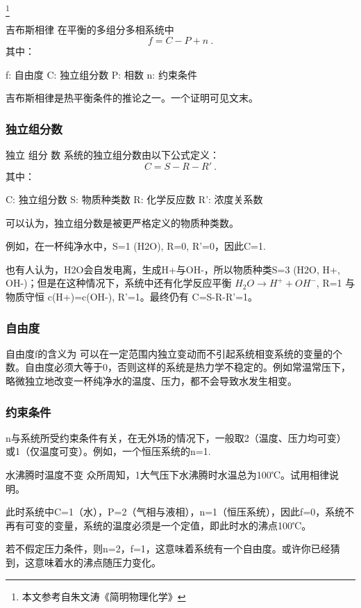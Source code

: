 
\footnote{本文参考自朱文涛《简明物理化学》}

\begin{theorem}{吉布斯相律}
在平衡的多组分多相系统中
\begin{equation}
f=C-P+n~.
\end{equation}
其中：

f: 自由度
C: 独立组分数
P: 相数
n: 约束条件
\end{theorem}
吉布斯相律是热平衡条件的推论之一。一个证明可见文末。

\subsubsection{独立组分数}
\begin{definition}{独立 组分 数}
系统的独立组分数由以下公式定义：
\begin{equation}
C=S-R-R'~.
\end{equation}
其中：

C: 独立组分数
S: 物质种类数
R: 化学反应数
R': 浓度关系数
\end{definition}

可以认为，独立组分数是被更严格定义的物质种类数。

例如，在一杯纯净水中，S=1 (H2O), R=0, R'=0，因此C=1.

也有人认为，H2O会自发电离，生成H+与OH-，所以物质种类S=3 (H2O, H+, OH-)；但是在这种情况下，系统中还有化学反应平衡 $H_2O\rightarrow H^++OH^-$, R=1 与物质守恒 c(H+)=c(OH-), R'=1。最终仍有 C=S-R-R'=1。

\subsubsection{自由度}
自由度f的含义为 可以在一定范围内独立变动而不引起系统相变系统的变量的个数。自由度必须大等于0，否则这样的系统是热力学不稳定的。例如常温常压下，略微独立地改变一杯纯净水的温度、压力，都不会导致水发生相变。

\subsubsection{约束条件}
n与系统所受约束条件有关，在无外场的情况下，一般取2（温度、压力均可变）或1（仅温度可变）。例如，一个恒压系统的n=1.

\begin{example}{水沸腾时温度不变}
众所周知，1大气压下水沸腾时水温总为100℃。试用相律说明。

此时系统中C=1（水），P=2（气相与液相），n=1（恒压系统），因此f=0，系统不再有可变的变量，系统的温度必须是一个定值，即此时水的沸点100℃。

若不假定压力条件，则n=2，f=1，这意味着系统有一个自由度。或许你已经猜到，这意味着水的沸点随压力变化。
\end{example}

